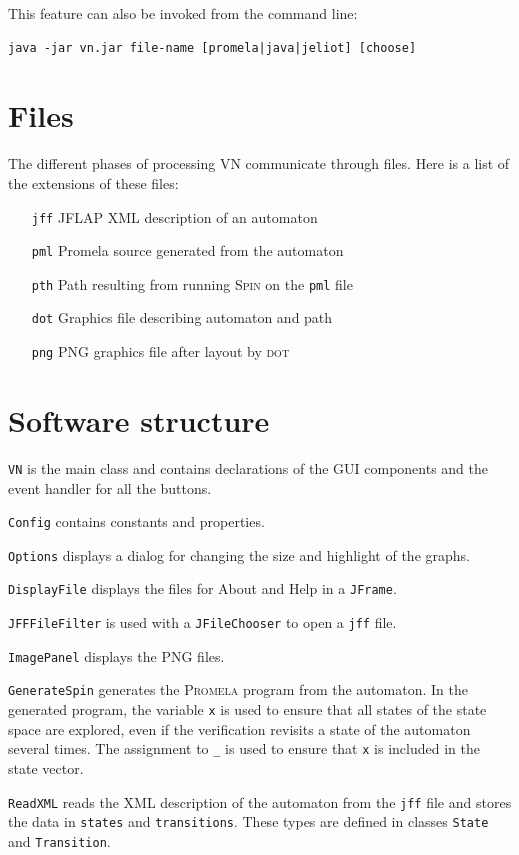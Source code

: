 \documentclass[11pt]{article}
\newcommand{\vn}{\textsc{VN}}
\newcommand{\dt}{\textsc{dot}}
\newcommand{\spn}{\textsc{Spin}}
\newcommand{\prm}{\textsc{Promela}}
\newcommand{\p}[1]{\texttt{#1}}
\newcommand{\bu}[1]{\textsf{#1}}
\begin{document}
This feature can also be invoked from the command line:
\begin{verbatim}
java -jar vn.jar file-name [promela|java|jeliot] [choose]
\end{verbatim}


\section{Files}
The different phases of processing \vn{} communicate through files. Here is a
list of the extensions of these files:
\begin{itemize}
  \item[\p{jff}] JFLAP XML description of an automaton
  \item[\p{pml}] Promela source generated from the automaton
  \item[\p{pth}] Path resulting from running \spn{} on the \p{pml} file
  \item[\p{dot}] Graphics file describing automaton and path
  \item[\p{png}] \textsc{PNG} graphics file after layout by \dt{}
\end{itemize}


\section{Software structure}
\p{VN} is the main class and contains declarations
of the GUI components and the event handler for all the buttons.

\p{Config} contains constants and properties.

\p{Options} displays a dialog for changing the size and highlight of the graphs.

\p{DisplayFile} displays the files for \bu{About} and \bu{Help}
in a \p{JFrame}.

\p{JFFFileFilter} is used with a \p{JFileChooser} to open a \p{jff} file.

\p{ImagePanel} displays the \textsc{PNG} files.

\p{GenerateSpin} generates the \prm{} program from the automaton.
In the generated program, the variable \p{x} is used to ensure that all
states of the state space are explored, even if the verification
revisits a state of the automaton several times. The assignment to
\p{\_} is used to ensure that \p{x} is included in the state vector.

\p{ReadXML} reads the XML description of the automaton from the \p{jff} file and
stores the data in \p{states} and \p{transitions}. These types are defined in
classes \p{State} and \p{Transition}.
\end{document}
